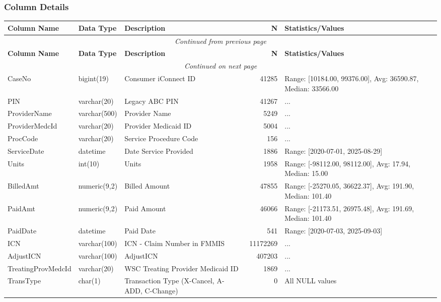 \begin{landscape}
\subsubsection{Column Details}
\begin{longtable}{|l|l|l|r|p{6cm}|}
\hline
\textbf{Column Name} & \textbf{Data Type} & \textbf{Description} & \textbf{N} & \textbf{Statistics/Values} \\
\hline
\endfirsthead
\multicolumn{5}{c}{\textit{Continued from previous page}} \\
\hline
\textbf{Column Name} & \textbf{Data Type} & \textbf{Description} & \textbf{N} & \textbf{Statistics/Values} \\
\hline
\endhead
\hline
\multicolumn{5}{c}{\textit{Continued on next page}} \\
\endfoot
\hline
\endlastfoot
CaseNo & bigint(19) & Consumer iConnect ID & 41285 & Range: [10184.00, 99376.00], Avg: 36590.87, Median: 33566.00 \\
\hline
PIN & varchar(20) & Legacy ABC PIN & 41267 & ... \\
\hline
ProviderName & varchar(500) & Provider Name & 5249 & ... \\
\hline
ProviderMedcId & varchar(20) & Provider Medicaid ID & 5004 & ... \\
\hline
ProcCode & varchar(20) & Service Procedure Code & 156 & ... \\
\hline
ServiceDate & datetime & Date Service Provided & 1886 & Range: [2020-07-01, 2025-08-29] \\
\hline
Units & int(10) & Units & 1958 & Range: [-98112.00, 98112.00], Avg: 17.94, Median: 15.00 \\
\hline
BilledAmt & numeric(9,2) & Billed Amount & 47855 & Range: [-25270.05, 36622.37], Avg: 191.90, Median: 101.40 \\
\hline
PaidAmt & numeric(9,2) & Paid Amount & 46066 & Range: [-21173.51, 26975.48], Avg: 191.69, Median: 101.40 \\
\hline
PaidDate & datetime & Paid Date & 541 & Range: [2020-07-03, 2025-09-03] \\
\hline
ICN & varchar(100) & ICN - Claim Number in FMMIS & 11172269 & ... \\
\hline
AdjustICN & varchar(100) & AdjustICN & 407203 & ... \\
\hline
TreatingProvMedcId & varchar(20) & WSC Treating Provider Medicaid ID & 1869 & ... \\
\hline
TransType & char(1) & Transaction Type (X-Cancel, A-ADD, C-Change) & 0 & All NULL values \\

\end{longtable}
\end{landscape}
